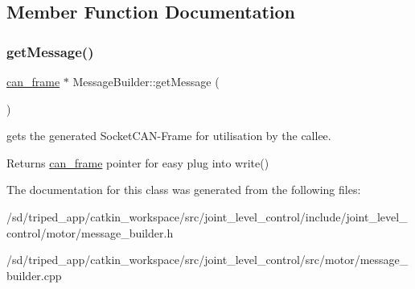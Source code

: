 \subsection{Member Function Documentation}
\mbox{\label{classMessageBuilder_a588441e4327872e90c3442e1cecd50c3}} 
\subsubsection{\texorpdfstring{get\+Message()}{getMessage()}}
{\footnotesize\ttfamily \hyperlink{structcan__frame}{can\+\_\+frame} $\ast$ Message\+Builder\+::get\+Message (\begin{DoxyParamCaption}{ }\end{DoxyParamCaption})}



gets the generated Socket\+C\+A\+N-\/\+Frame for utilisation by the callee. 

\begin{DoxyReturn}{Returns}
\hyperlink{structcan__frame}{can\+\_\+frame} pointer for easy plug into write() 
\end{DoxyReturn}


The documentation for this class was generated from the following files\+:\begin{DoxyCompactItemize}
\item 
/sd/triped\+\_\+app/catkin\+\_\+workspace/src/joint\+\_\+level\+\_\+control/include/joint\+\_\+level\+\_\+control/motor/message\+\_\+builder.\+h\item 
/sd/triped\+\_\+app/catkin\+\_\+workspace/src/joint\+\_\+level\+\_\+control/src/motor/message\+\_\+builder.\+cpp\end{DoxyCompactItemize}
